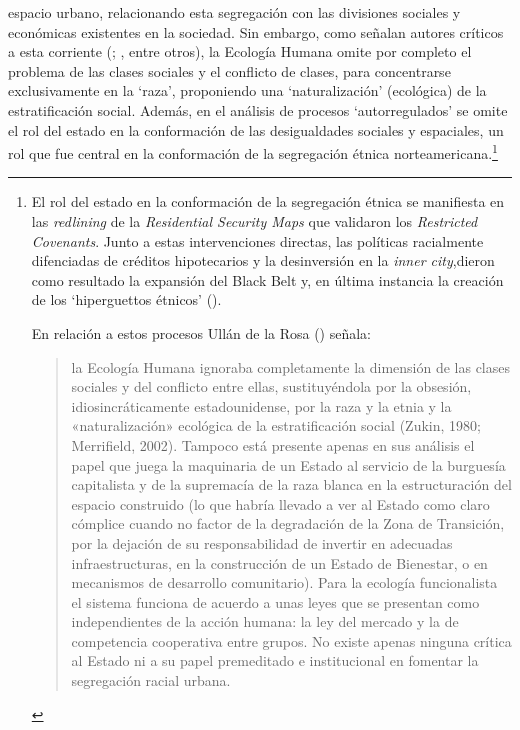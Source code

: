 \documentclass[
  spanish,
  a4paper,%
  chapterprefix=true,%
  DIV=calc,%
  twoside]{scrbook}%
\begin{document}
espacio urbano, relacionando esta segregación con las divisiones
sociales y económicas existentes en la sociedad. Sin embargo, como
señalan autores críticos a esta corriente (; , entre otros), la Ecología Humana omite por completo
el problema de las clases sociales y el conflicto de clases, para
concentrarse exclusivamente en la `raza', proponiendo una
`naturalización' (ecológica) de la estratificación social. Además, en el
análisis de procesos `autorregulados' se omite el rol del estado en la
conformación de las desigualdades sociales y espaciales, un rol que fue
central en la conformación de la segregación étnica
norteamericana.\footnote{El rol del estado en la conformación de la
  segregación étnica se manifiesta en las \emph{redlining} de la
  \emph{Residential Security Maps} que validaron los \emph{Restricted
  Covenants}. Junto a estas intervenciones directas, las políticas
  racialmente difenciadas de créditos hipotecarios y la desinversión
  en la \emph{inner city},dieron como resultado la expansión del Black Belt
  y, en última instancia la creación de los `hiperguettos étnicos'
  ().

  En relación a estos procesos Ullán de la Rosa () señala:

  \begin{quote}
  la Ecología Humana ignoraba completamente la dimensión de las
  clases sociales y del conflicto entre ellas, sustituyéndola por la
  obsesión, idiosincráticamente estadounidense, por la raza y la
  etnia y la «naturalización» ecológica de la estratificación social
  (Zukin, 1980; Merrifield, 2002). Tampoco está presente apenas en
  sus análisis el papel que juega la maquinaria de un Estado al
  servicio de la burguesía capitalista y de la supremacía de la raza
  blanca en la estructuración del espacio construido (lo que habría
  llevado a ver al Estado como claro cómplice cuando no factor de la
  degradación de la Zona de Transición, por la dejación de su
  responsabilidad de invertir en adecuadas infraestructuras, en la
  construcción de un Estado de Bienestar, o en mecanismos de
  desarrollo comunitario). Para la ecología funcionalista el sistema
  funciona de acuerdo a unas leyes que se presentan como
  independientes de la acción humana: la ley del mercado y la de
  competencia cooperativa entre grupos. No existe apenas ninguna
  crítica al Estado ni a su papel premeditado e institucional en
  fomentar la segregación racial urbana.
  \end{quote}}
\end{document}
